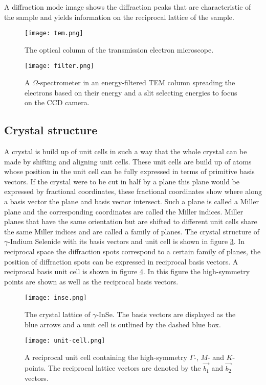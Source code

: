 A diffraction mode image shows the diffraction peaks that are characteristic of the sample and yields information on the reciprocal lattice of the sample.\cite{Egerton_2008}
%
\begin{figure}[H]
	\centering
	\captionsetup{width=0.9\linewidth}
	\texttt{[image: tem.png]}
	\caption{The optical column of the transmission electron microscope.}
	\label{fig:tem}
\end{figure}
%
\begin{figure}[H]
	\centering
	\captionsetup{width=0.9\linewidth}
	\texttt{[image: filter.png]}
	\caption{A $\Omega$-spectrometer in an energy-filtered TEM column spreading the electrons based on their energy and a slit selecting energies to focus on the CCD camera.}
	\label{fig:filter}
\end{figure}
\vfill
\subsection{Crystal structure}
A crystal is build up of unit cells in such a way that the whole crystal can be made by shifting and aligning unit cells. These unit cells are build up of atoms whose position in the unit cell can be fully expressed in terms of primitive basis vectors. If the crystal were to be cut in half by a plane this plane would be expressed by fractional coordinates, these fractional coordinates show where along a basis vector the plane and basis vector intersect. Such a plane is called a Miller plane and the corresponding coordinates are called the Miller indices. Miller planes that have the same orientation but are shifted to different unit cells share the same Miller indices and are called a family of planes. The crystal structure of $\gamma$-Indium Selenide with its basis vectors and unit cell is shown in figure \ref{fig:inse}. In reciprocal space the diffraction spots correspond to a certain family of planes, the position of diffraction spots can be expressed in reciprocal basis vectors. A reciprocal basis unit cell is shown in figure \ref{fig:unit-cell}. In this figure the high-symmetry points are shown as well as the reciprocal basis vectors.\\
%
\begin{figure}[H]
	\centering
	\captionsetup{width=0.9\linewidth}
	\texttt{[image: inse.png]}
	\caption{The crystal lattice of $\gamma$-InSe. The basis vectors are displayed as the blue arrows and a unit cell is outlined by the dashed blue box.}
	\label{fig:inse}
\end{figure}
%
\begin{figure}[H]
	\centering
	\captionsetup{width=0.9\linewidth}
	\texttt{[image: unit-cell.png]}
	\caption{A reciprocal unit cell containing the high-symmetry $\Gamma$-, $M$- and $K$-points. The reciprocal lattice vectors are denoted by the $\vec{b_1}$ and $\vec{b_2}$ vectors.}
	\label{fig:unit-cell}
\end{figure}
%
